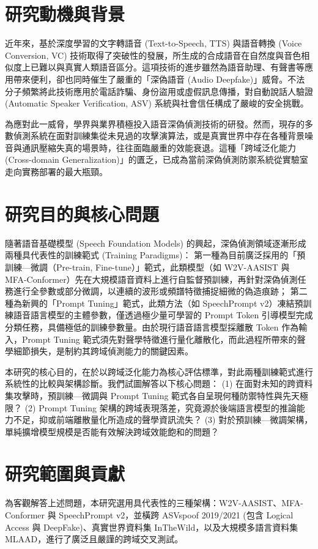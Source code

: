 \section{研究動機與背景}
近年來，基於深度學習的文字轉語音 (Text-to-Speech, TTS) 與語音轉換 (Voice Conversion, VC) 技術取得了突破性的發展，所生成的合成語音在自然度與音色相似度上已難以與真實人類語音區分。這項技術的進步雖然為語音助理、有聲書等應用帶來便利，卻也同時催生了嚴重的「深偽語音 (Audio Deepfake)」威脅。不法分子頻繁將此技術應用於電話詐騙、身份盜用或虛假訊息傳播，對自動說話人驗證 (Automatic Speaker Verification, ASV) 系統與社會信任構成了嚴峻的安全挑戰。

為應對此一威脅，學界與業界積極投入語音深偽偵測技術的研發。然而，現存的多數偵測系統在面對訓練集從未見過的攻擊演算法，或是真實世界中存在各種背景噪音與通訊壓縮失真的場景時，往往面臨嚴重的效能衰退。這種「跨域泛化能力 (Cross-domain Generalization)」的匱乏，已成為當前深偽偵測防禦系統從實驗室走向實務部署的最大瓶頸。

\section{研究目的與核心問題}
隨著語音基礎模型 (Speech Foundation Models) 的興起，深偽偵測領域逐漸形成兩種具代表性的訓練範式 (Training Paradigms)：
第一種為目前廣泛採用的「預訓練—微調（Pre-train, Fine-tune）」範式，此類模型（如 W2V-AASIST 與 MFA-Conformer）先在大規模語音資料上進行自監督預訓練，再針對深偽偵測任務進行全參數或部分微調，以連續的波形或頻譜特徵捕捉細微的偽造痕跡；
第二種為新興的「Prompt Tuning」範式，此類方法（如 SpeechPrompt v2）凍結預訓練語音語言模型的主體參數，僅透過極少量可學習的 Prompt Token 引導模型完成分類任務，具備極低的訓練參數量。由於現行語音語言模型採離散 Token 作為輸入，Prompt Tuning 範式須先對聲學特徵進行量化離散化，而此過程所帶來的聲學細節損失，是制約其跨域偵測能力的關鍵因素。

本研究的核心目的，在於以跨域泛化能力為核心評估標準，對此兩種訓練範式進行系統性的比較與架構診斷。我們試圖解答以下核心問題：
(1) 在面對未知的跨資料集攻擊時，預訓練—微調與 Prompt Tuning 範式各自呈現何種防禦特性與先天極限？
(2) Prompt Tuning 架構的跨域表現落差，究竟源於後端語言模型的推論能力不足，抑或前端離散量化所造成的聲學資訊流失？
(3) 對於預訓練—微調架構，單純擴增模型規模是否能有效解決跨域效能飽和的問題？

\section{研究範圍與貢獻}
為客觀解答上述問題，本研究選用具代表性的三種架構：W2V-AASIST、MFA-Conformer 與 SpeechPrompt v2，並橫跨 ASVspoof 2019/2021 (包含 Logical Access 與 DeepFake)、真實世界資料集 InTheWild，以及大規模多語言資料集 MLAAD，進行了廣泛且嚴謹的跨域交叉測試。

